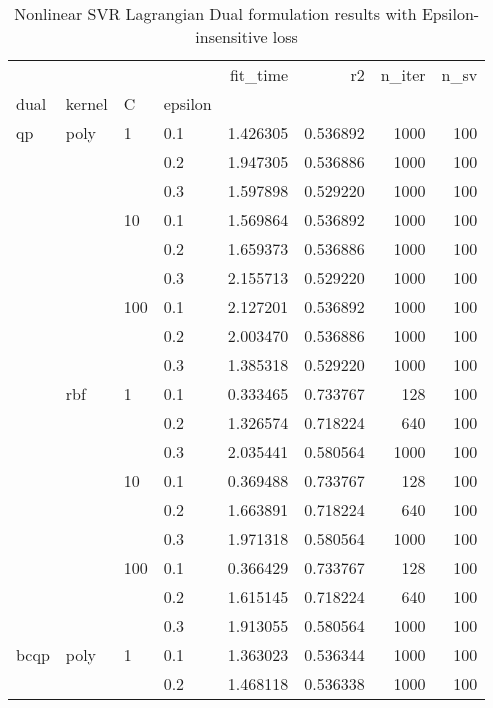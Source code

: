 \begin{table}[H]
\centering
\caption{Nonlinear SVR Lagrangian Dual formulation results with Epsilon-insensitive loss}
\label{nonlinear_lagrangian_dual_svr_cv_results}
\begin{tabular}{llllrrrr}
\toprule
     &     &     &     &  fit\_time &        r2 &  n\_iter &  n\_sv \\
dual & kernel & C & epsilon &           &           &         &       \\
\midrule
qp & poly & 1   & 0.1 &  1.426305 &  0.536892 &    1000 &   100 \\
     &     &     & 0.2 &  1.947305 &  0.536886 &    1000 &   100 \\
     &     &     & 0.3 &  1.597898 &  0.529220 &    1000 &   100 \\
     &     & 10  & 0.1 &  1.569864 &  0.536892 &    1000 &   100 \\
     &     &     & 0.2 &  1.659373 &  0.536886 &    1000 &   100 \\
     &     &     & 0.3 &  2.155713 &  0.529220 &    1000 &   100 \\
     &     & 100 & 0.1 &  2.127201 &  0.536892 &    1000 &   100 \\
     &     &     & 0.2 &  2.003470 &  0.536886 &    1000 &   100 \\
     &     &     & 0.3 &  1.385318 &  0.529220 &    1000 &   100 \\
     & rbf & 1   & 0.1 &  0.333465 &  0.733767 &     128 &   100 \\
     &     &     & 0.2 &  1.326574 &  0.718224 &     640 &   100 \\
     &     &     & 0.3 &  2.035441 &  0.580564 &    1000 &   100 \\
     &     & 10  & 0.1 &  0.369488 &  0.733767 &     128 &   100 \\
     &     &     & 0.2 &  1.663891 &  0.718224 &     640 &   100 \\
     &     &     & 0.3 &  1.971318 &  0.580564 &    1000 &   100 \\
     &     & 100 & 0.1 &  0.366429 &  0.733767 &     128 &   100 \\
     &     &     & 0.2 &  1.615145 &  0.718224 &     640 &   100 \\
     &     &     & 0.3 &  1.913055 &  0.580564 &    1000 &   100 \\
bcqp & poly & 1   & 0.1 &  1.363023 &  0.536344 &    1000 &   100 \\
     &     &     & 0.2 &  1.468118 &  0.536338 &    1000 &   100 \\

\end{tabular}
\end{table}
